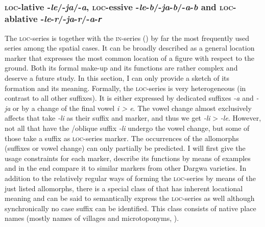 
\subsubsection{\textsc{loc}-lative -\textit{le}/-\textit{ja}/-\textit{a}, \textsc{loc}-essive -\textit{le}-\textit{b}/-\textit{ja}-\textit{b}/-\textit{a}-\textit{b} and \textsc{loc}-ablative -\textit{le}-\textit{r}/-\textit{ja}-\textit{r}/-\textit{a}-\textit{\texttt{r}}}
\label{sssec:spr-lative -le/-ja/-a, spr-essive -le-b/-ja-b/-a-b and spr-ablative -le-r/-ja-r/-a-r} 

The \textsc{loc}-series is together with the \textsc{in}-series () by far the most frequently used series among the spatial cases. It can be broadly described as a general location marker that expresses the most common location of a figure with respect to the ground. Both its formal make-up and its functions are rather complex and deserve a future study. In this section, I can only provide a sketch of its formation and its meaning. Formally, the \textsc{loc}-series is very heterogeneous (in contrast to all other  suffixes). It is either expressed by dedicated suffixes \textit{-a} and \textit{-ja} or by a change of the final vowel \textit{i > e}. The vowel change almost exclusively affects  that take \textit{-li} as their  suffix and  marker, and thus we get \textit{-li} > \textit{-le}. However, not all  that have the \slash oblique suffix \textit{-li} undergo the vowel change, but some of those  take a suffix as \textsc{loc}-series marker. The occurrences of the allomorphs (suffixes or vowel change) can only partially be predicted. I will first give the usage constraints for each marker, describe its functions by means of examples and in the end compare it to similar markers from other Dargwa varieties. In addition to the relatively regular ways of forming the \textsc{loc}-series by means of the just listed allomorphs, there is a special class of  that has inherent locational meaning and can be said to semantically express the \textsc{loc}-series as well although synchronically no case suffix can be identified. This class consists of native place names (mostly names of villages and microtoponyms, ).

